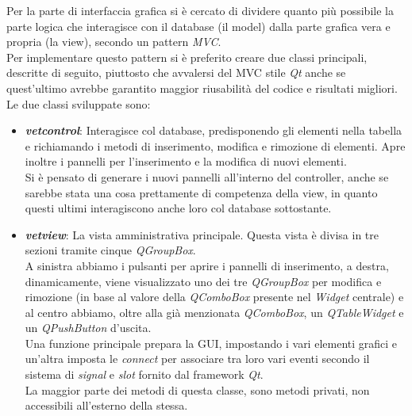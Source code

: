 Per la parte di interfaccia grafica si è cercato di dividere quanto più possibile la parte logica che interagisce con il database (il model) dalla parte grafica vera e propria (la view), secondo un pattern \textit{MVC}.\\ Per implementare questo pattern si è preferito creare due classi principali, descritte di seguito, piuttosto che avvalersi del MVC stile \textit{Qt} anche se quest'ultimo avrebbe garantito maggior riusabilità del codice e risultati migliori. 
Le due classi sviluppate sono:

\begin{itemize}
	\item \textit{\textbf{vetcontrol}}: Interagisce col database, predisponendo gli elementi nella tabella e richiamando i metodi di inserimento, modifica e rimozione di elementi. Apre inoltre i pannelli per l'inserimento e la modifica di nuovi elementi. \\Si è pensato di generare i nuovi pannelli all'interno del controller, anche se sarebbe stata una cosa prettamente di competenza della view, in quanto questi ultimi interagiscono anche loro col database sottostante. 
	\item \textit{\textbf{vetview}}: La vista amministrativa principale. Questa vista è divisa in tre sezioni tramite cinque \textit{QGroupBox}. \\A sinistra abbiamo i pulsanti per aprire i pannelli di inserimento, a destra, dinamicamente, viene visualizzato uno dei tre \textit{QGroupBox} per modifica e rimozione (in base al valore della \textit{QComboBox} presente nel \textit{Widget} centrale)  e al centro abbiamo, oltre alla già menzionata \textit{QComboBox}, un \textit{QTableWidget} e un \textit{QPushButton} d'uscita. \\Una funzione principale prepara la GUI, impostando i vari elementi grafici e un'altra imposta le \textit{connect} per associare tra loro vari eventi secondo il sistema di \textit{signal} e \textit{slot} fornito dal framework \textit{Qt}. \\La maggior parte dei metodi di questa classe, sono metodi privati, non accessibili all'esterno della stessa. 
\end{itemize}

